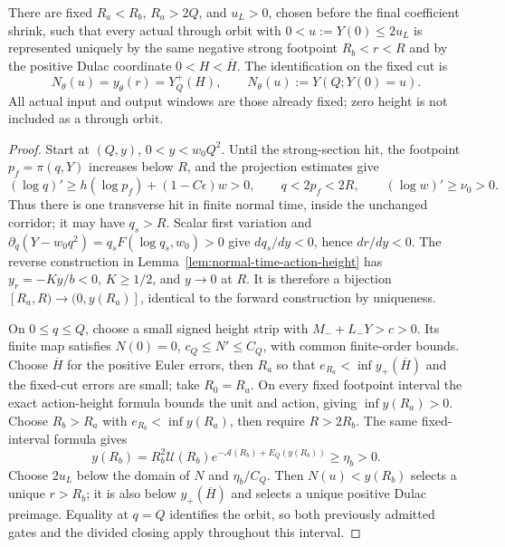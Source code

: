 \begin{lemma}
\label{ann:p0-low-height-exhaustion}
There are fixed \(R_a<R_b\), \(R_a>2Q\), and \(u_L>0\), chosen
before the final coefficient shrink, such that every actual through
orbit with \(0<u:=Y(0)\le2u_L\) is represented uniquely by the
same negative strong footpoint \(R_b<r<R\) and by the positive
Dulac coordinate \(0<H<\overline H\). The identification on the
fixed cut is
\[
 N_\theta(u)=y_\theta(r)=Y_Q^+(H),
 \qquad N_\theta(u):=Y(Q;Y(0)=u).
\]
All actual input and output windows are those already fixed; zero
height is not included as a through orbit.
\end{lemma}
\begin{proof}
Start at \((Q,y)\), \(0<y<w_0Q^2\). Until the strong-section hit,
the footpoint \(p_f=\pi(q,Y)\) increases below \(R\), and the
projection estimates give
\[
 (\log q)'\ge h(\log p_f)+(1-C\epsilon)w>0,\qquad
 q<2p_f<2R,\qquad (\log w)'\ge\nu_0>0.
\]
Thus there is one transverse hit in finite normal time, inside the
unchanged corridor; it may have \(q_s>R\). Scalar first variation
and \(\partial_q(Y-w_0q^2)=q_sF(\log q_s,w_0)>0\) give
\(dq_s/dy<0\), hence \(dr/dy<0\). The reverse construction in
Lemma~\ref{lem:normal-time-action-height} has
\(y_r=-Ky/b<0\), \(K\ge1/2\), and \(y\to0\) at \(R\).
It is therefore a bijection \([R_a,R)\to(0,y(R_a)]\), identical
to the forward construction by uniqueness.

On \(0\le q\le Q\), choose a small signed height strip with
\(M_-+L_-Y>c>0\). Its finite map satisfies
\(N(0)=0\), \(c_Q\le N'\le C_Q\), with common finite-order bounds.
Choose \(\overline H\) for the positive Euler errors, then \(R_a\)
so that \(e_{R_a}<\inf y_+(\overline H)\) and the fixed-cut errors
are small; take \(R_0=R_a\). On every fixed footpoint interval the
exact action-height formula bounds the unit and action, giving
\(\inf y(R_a)>0\). Choose \(R_b>R_a\) with
\(e_{R_b}<\inf y(R_a)\), then require \(R>2R_b\).
The same fixed-interval formula gives
\[
 y(R_b)=R_b^2\mathcal U(R_b)
 e^{-\mathcal A(R_b)+E_Q(y(R_b))}\ge\eta_b>0.
\]
Choose \(2u_L\) below the domain of \(N\) and \(\eta_b/C_Q\).
Then \(N(u)<y(R_b)\) selects a unique \(r>R_b\); it is also below
\(y_+(\overline H)\) and selects a unique positive Dulac preimage.
Equality at \(q=Q\) identifies the orbit, so both previously admitted
gates and the divided closing apply throughout this interval.
\end{proof}

